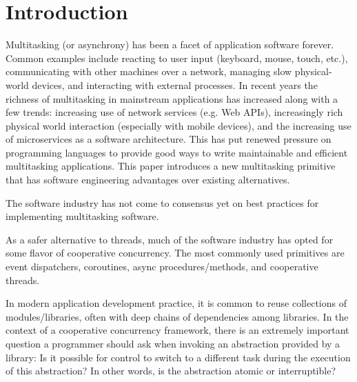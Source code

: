 \documentclass[9pt,preprint]{sigplanconf}
\begin{document}




\section{Introduction}

Multitasking (or asynchrony) has been a facet of application software forever.
Common examples include reacting to user input (keyboard, mouse, touch, etc.), communicating with other machines over a network, managing slow physical-world devices, and interacting with external processes.
In recent years the richness of multitasking in mainstream applications has increased along with a few trends: increasing use of network services (e.g. Web APIs), increasingly rich physical world interaction (especially with mobile devices), and the increasing use of microservices as a software architecture.
This has put renewed pressure on programming languages to provide good ways to write maintainable and efficient multitasking applications.
This paper introduces a new multitasking primitive that has software engineering advantages over existing alternatives.

The software industry has not come to consensus yet on best practices for implementing multitasking software.

As a safer alternative to threads, much of the software industry has opted for some flavor of cooperative concurrency.
The most commonly used primitives are event dispatchers, coroutines, async procedures/methods, and cooperative threads.

In modern application development practice, it is common to reuse collections of modules/libraries, often with deep chains of dependencies among libraries.
In the context of a cooperative concurrency framework, there is an extremely important question a programmer should ask when invoking an abstraction provided by a library:
Is it possible for control to switch to a different task during the execution of this abstraction?
In other words, is the abstraction atomic or interruptible?
\end{document}
